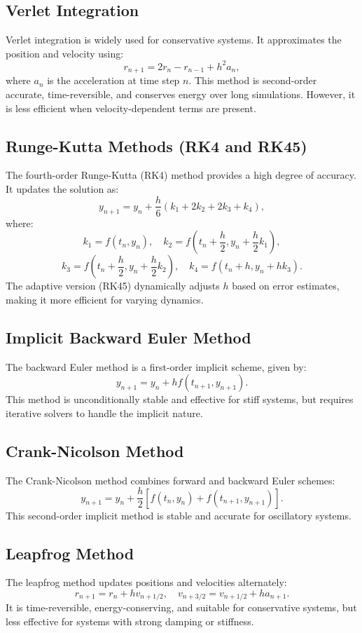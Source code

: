 \documentclass[12pt]{article}
\begin{document}
\subsection{Verlet Integration}
Verlet integration is widely used for conservative systems. It approximates the position and velocity using:
\[
r_{n+1} = 2r_n - r_{n-1} + h^2 a_n,
\]
where \( a_n \) is the acceleration at time step \( n \). This method is second-order accurate, time-reversible, and conserves energy over long simulations. However, it is less efficient when velocity-dependent terms are present.

\subsection{Runge-Kutta Methods (RK4 and RK45)}
The fourth-order Runge-Kutta (RK4) method provides a high degree of accuracy. It updates the solution as:
\[
y_{n+1} = y_n + \frac{h}{6}(k_1 + 2k_2 + 2k_3 + k_4),
\]
where:
\[
k_1 = f(t_n, y_n), \quad
k_2 = f\left(t_n + \frac{h}{2}, y_n + \frac{h}{2}k_1\right),
\]
\[
k_3 = f\left(t_n + \frac{h}{2}, y_n + \frac{h}{2}k_2\right), \quad
k_4 = f(t_n + h, y_n + hk_3).
\]
The adaptive version (RK45) dynamically adjusts \( h \) based on error estimates, making it more efficient for varying dynamics.

\subsection{Implicit Backward Euler Method}
The backward Euler method is a first-order implicit scheme, given by:
\[
y_{n+1} = y_n + h f(t_{n+1}, y_{n+1}).
\]
This method is unconditionally stable and effective for stiff systems, but requires iterative solvers to handle the implicit nature.

\subsection{Crank-Nicolson Method}
The Crank-Nicolson method combines forward and backward Euler schemes:
\[
y_{n+1} = y_n + \frac{h}{2}\left[f(t_n, y_n) + f(t_{n+1}, y_{n+1})\right].
\]
This second-order implicit method is stable and accurate for oscillatory systems.

\subsection{Leapfrog Method}
The leapfrog method updates positions and velocities alternately:
\[
r_{n+1} = r_n + h v_{n+1/2}, \quad
v_{n+3/2} = v_{n+1/2} + h a_{n+1}.
\]
It is time-reversible, energy-conserving, and suitable for conservative systems, but less effective for systems with strong damping or stiffness.
\end{document}
